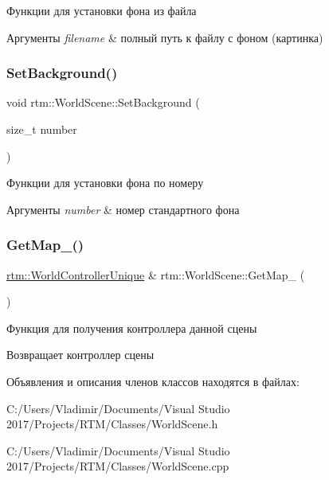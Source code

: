 Функции для установки фона из файла 
\begin{DoxyParams}{Аргументы}
{\em filename} & полный путь к файлу с фоном (картинка) \\
\hline
\end{DoxyParams}
\mbox{\label{classrtm_1_1_world_scene_a097fa828c003f8757faf1aebdd0e63f1}} 
\subsubsection{\texorpdfstring{Set\+Background()}{SetBackground()}\hspace{0.1cm}{\footnotesize\ttfamily [2/2]}}
{\footnotesize\ttfamily void rtm\+::\+World\+Scene\+::\+Set\+Background (\begin{DoxyParamCaption}\item[{size\+\_\+t}]{number }\end{DoxyParamCaption})}

Функции для установки фона по номеру 
\begin{DoxyParams}{Аргументы}
{\em number} & номер стандартного фона \\
\hline
\end{DoxyParams}
\mbox{\label{classrtm_1_1_world_scene_a8995a69857907834953be1bb2ccb2845}} 
\subsubsection{\texorpdfstring{Get\+Map\+\_\+()}{GetMap\_()}}
{\footnotesize\ttfamily \hyperlink{namespacertm_a3081db54851f6008db32c1ee28d14ecf}{rtm\+::\+World\+Controller\+Unique} \& rtm\+::\+World\+Scene\+::\+Get\+Map\+\_\+ (\begin{DoxyParamCaption}{ }\end{DoxyParamCaption})\hspace{0.3cm}{\ttfamily [private]}}

Функция для получения контроллера данной сцены \begin{DoxyReturn}{Возвращает}
контроллер сцены 
\end{DoxyReturn}


Объявления и описания членов классов находятся в файлах\+:\begin{DoxyCompactItemize}
\item 
C\+:/\+Users/\+Vladimir/\+Documents/\+Visual Studio 2017/\+Projects/\+R\+T\+M/\+Classes/World\+Scene.\+h\item 
C\+:/\+Users/\+Vladimir/\+Documents/\+Visual Studio 2017/\+Projects/\+R\+T\+M/\+Classes/World\+Scene.\+cpp\end{DoxyCompactItemize}
